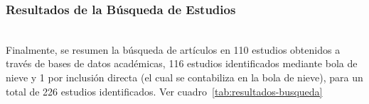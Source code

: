 \subsubsection{Resultados de la Búsqueda de Estudios}\label{subsubsec:resultados-busqueda}
\mbox{}\\
Finalmente, se resumen la búsqueda de artículos en 110 estudios obtenidos a través de bases de datos académicas, 116 estudios identificados mediante bola de nieve y 1 por inclusión directa (el cual se contabiliza en la bola de nieve), para un total de 226 estudios identificados. Ver cuadro~\ref{tab:resultados-busqueda}
\mbox{}\\